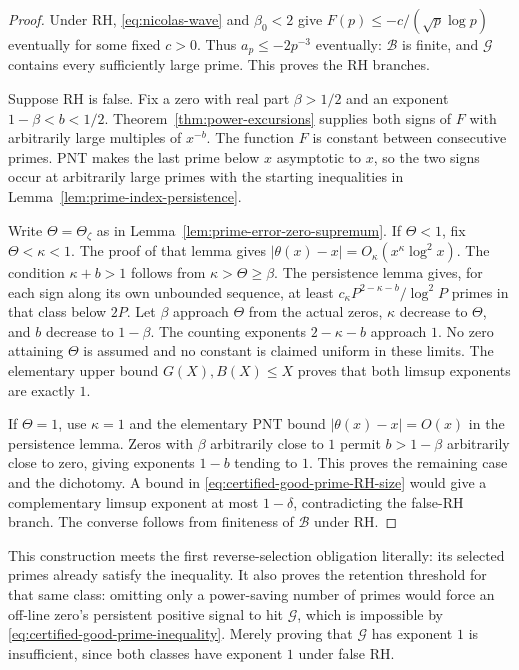 \documentclass[11pt]{article}
\theoremstyle{definition}
\begin{document}
\begin{proof}
Under RH, \eqref{eq:nicolas-wave} and $\beta_0<2$ give
$F(p)\le-c/(\sqrt p\log p)$ eventually for some fixed $c>0$.
Thus $a_p\le-2p^{-3}$ eventually: $\mathcal B$ is finite,
and $\mathcal G$ contains every sufficiently large prime.
This proves the RH branches.

Suppose RH is false. Fix a zero with real part $\beta>1/2$
and an exponent $1-\beta<b<1/2$.
Theorem~\ref{thm:power-excursions} supplies both signs of $F$
with arbitrarily large multiples of $x^{-b}$.
The function $F$ is constant between consecutive primes.
PNT makes the last prime below $x$ asymptotic to $x$,
so the two signs occur at arbitrarily large primes
with the starting inequalities in
Lemma~\ref{lem:prime-index-persistence}.

Write $\Theta=\Theta_\zeta$ as in
Lemma~\ref{lem:prime-error-zero-supremum}.
If $\Theta<1$, fix $\Theta<\kappa<1$.
The proof of that lemma gives
$|\theta(x)-x|=O_\kappa(x^\kappa\log^2x)$.
The condition $\kappa+b>1$ follows from $\kappa>\Theta\ge\beta$.
The persistence lemma gives, for each sign along its own
unbounded sequence, at least
$c_\kappa P^{2-\kappa-b}/\log^2P$ primes in that class below $2P$.
Let $\beta$ approach $\Theta$ from the actual zeros,
$\kappa$ decrease to $\Theta$, and $b$ decrease to $1-\beta$.
The counting exponents $2-\kappa-b$ approach $1$.
No zero attaining $\Theta$ is assumed and no constant is
claimed uniform in these limits.
The elementary upper bound $G(X),B(X)\le X$ proves that
both limsup exponents are exactly $1$.

If $\Theta=1$, use $\kappa=1$ and the elementary PNT bound
$|\theta(x)-x|=O(x)$ in the persistence lemma.
Zeros with $\beta$ arbitrarily close to $1$ permit $b>1-\beta$
arbitrarily close to zero, giving exponents $1-b$ tending to $1$.
This proves the remaining case and the dichotomy.
A bound in \eqref{eq:certified-good-prime-RH-size}
would give a complementary limsup exponent at most $1-\delta$,
contradicting the false-RH branch.
The converse follows from finiteness of $\mathcal B$ under RH.
\end{proof}

This construction meets the first reverse-selection obligation
literally: its selected primes already satisfy the inequality.
It also proves the retention threshold for that same class:
omitting only a power-saving number of primes would force an
off-line zero's persistent positive signal to hit $\mathcal G$,
which is impossible by \eqref{eq:certified-good-prime-inequality}.
Merely proving that $\mathcal G$ has exponent $1$ is insufficient,
since both classes have exponent $1$ under false RH.
\end{document}
